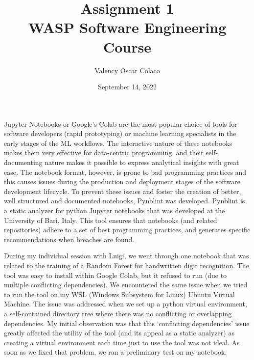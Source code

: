 \documentclass[11pt]{article}
\begin{document}
 
\title{\textbf{Assignment 1}\\WASP Software Engineering Course}
\author{Valency Oscar Colaco}
\date{September 14, 2022}
\maketitle

\par{Jupyter Notebooks or Google’s Colab are the most popular choice of tools for software developers (rapid prototyping) or machine learning specialists in the early stages of the ML workflows. The interactive nature of these notebooks makes them very effective for data-centric programming, and their self-documenting nature makes it possible to express analytical insights with great ease. The notebook format, however, is prone to bad programming practices and this causes issues during the production and deployment stages of the software development lifecycle. To prevent these issues and foster the creation of better, well structured and documented notebooks, Pynblint was developed. Pynblint is a static analyzer for python Jupyter notebooks that was developed at the University of Bari, Italy. This tool ensures that notebooks (and related repositories) adhere to a set of best programming practices, and generates specific recommendations when breaches are found.}
\\
\par{During my individual session with Luigi, we went through one notebook that was related to the training of a Random Forest for handwritten digit recognition. The tool was easy to install within Google Colab, but it refused to run (due to multiple conflicting dependencies). We encountered the same issue when we tried to run the tool on my WSL (Windows Subsystem for Linux) Ubuntu Virtual Machine. The issue was addressed when we set up a python virtual environment, a self-contained directory tree where there was no conflicting or overlapping dependencies. My initial observation was that this ‘conflicting dependencies’ issue greatly affected the utility of the tool (and its appeal as a static analyzer) as creating a virtual environment each time just to use the tool was not ideal. As soon as we fixed that problem, we ran a preliminary test on my notebook.} 
\\
\end{document}
